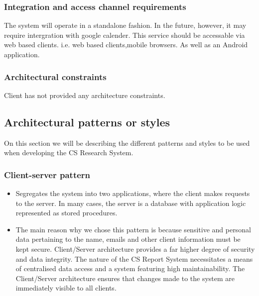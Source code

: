 \documentclass{article}
\begin{document}
			\subsubsection{Integration and access channel requirements}
				The system will operate in a standalone fashion. In the future, however, it may require intergration with google calender.
				This service should be accessable via web based clients. i.e. web based clients,mobile browsers. As well as an Android application.

			\subsubsection{Architectural constraints}
				Client has not provided any architecture constraints.
				

	
	

		\subsection{Architectural patterns or styles}
		On this section we will be describing the different patterns and styles to be used when developing the CS 		        Research System.
		\setcounter{secnumdepth}{5}
		\subsubsection{Client-server pattern} %
		\begin{itemize}
		 \item Segregates the system into two applications, where the client makes requests to the server. In many 				cases, the server is a database with application logic represented as stored procedures.
		

         \item  The main reason why we chose this pattern is because sensitive and personal data pertaining to the 				name, emails and other client information must be kept secure. Client/Server architecture provides a far 			higher 	degree of security and data integrity. The nature of the CS Report System necessitates a means of 				centralised data access and a system featuring high maintainability. The Client/Server architecture ensures that changes 	made to the system are immediately visible to all clients.
         \end{itemize}
\end{document}
